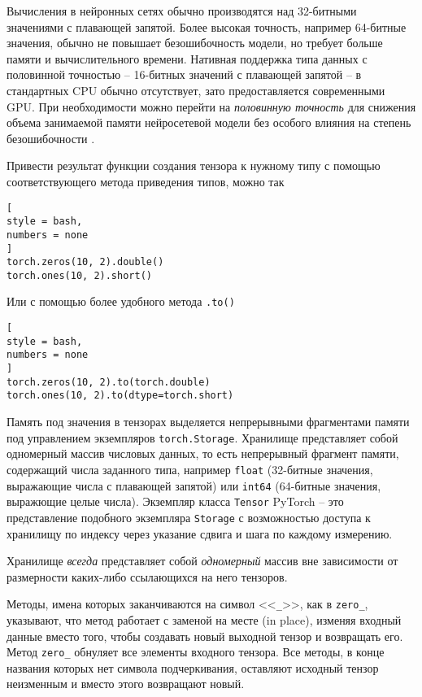 \documentclass[%
	11pt,
	a4paper,
	utf8,
		]{article}
\begin{document}
Вычисления в нейронных сетях обычно производятся над 32-битными значениями с плавающей запятой. Более высокая точность, например 64-битные значения, обычно не повышает безошибочность модели, но требует больше памяти и вычислительного времени. Нативная поддержка типа данных с половинной точностью -- 16-битных значений с плавающей запятой -- в стандартных CPU обычно отсутствует, зато предоставляется современными GPU. При необходимости можно перейти на \emph{половинную точность} для снижения объема занимаемой памяти нейросетевой модели без особого влияния на степень безошибочности \cite[]{pytorch-2022}.

Привести результат функции создания тензора к нужному типу с помощью соответствующего метода приведения типов, можно так
\begin{lstlisting}[
style = bash,
numbers = none
]
torch.zeros(10, 2).double()
torch.ones(10, 2).short()
\end{lstlisting}

Или с помощью более удобного метода \verb|.to()|
\begin{lstlisting}[
style = bash,
numbers = none	
]
torch.zeros(10, 2).to(torch.double)
torch.ones(10, 2).to(dtype=torch.short)
\end{lstlisting}

Память под значения в тензорах выделяется непрерывными фрагментами памяти под управлением экземпляров \verb|torch.Storage|. Хранилище представляет собой одномерный массив числовых данных, то есть непрерывный фрагмент памяти, содержащий числа заданного типа, например \verb|float| (32-битные значения, выражающие числа с плавающей запятой) или \verb|int64| (64-битные значения, выражющие целые числа). Экземпляр класса \verb|Tensor| PyTorch -- это представление подобного экземпляра \verb|Storage| с возможностью доступа к хранилищу по индексу через указание сдвига и шага по каждому измерению.

Хранилище \emph{всегда} представляет собой \emph{одномерный} массив вне зависимости от размерности каких-либо ссылающихся на него тензоров.

Методы, имена которых заканчиваются на символ <<\verb|_|>>, как в \verb|zero_|, указывают, что метод работает с заменой на месте (in place), изменяя входный данные вместо того, чтобы создавать новый выходной тензор и возвращать его. Метод \verb|zero_| обнуляет все элементы входного тензора. Все методы, в конце названия которых нет символа подчеркивания, оставляют исходный тензор неизменным и вместо этого возвращают новый.
\end{document}
